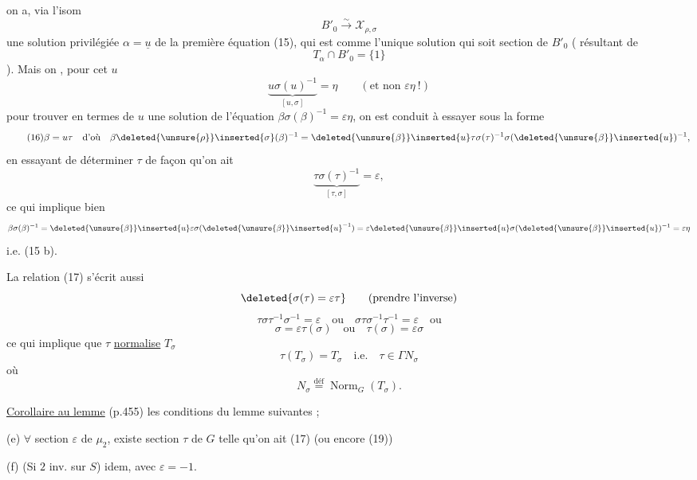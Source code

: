  on a, via l'isom
\[
B'_0\xrightarrow{\sim}\mathcal X_{\rho,\sigma}
\]
une solution privilégiée $\alpha=\underline u$ de la première équation (15), qui est
 comme l'unique solution qui soit  section de
$B'_0$ ( résultant de
\[
T_\alpha\cap B'_0=\{1\}
\]
).
Mais on , pour cet $u$
\[
\underbrace{u\sigma(u)^{-1}}_{[u,\sigma]}=\eta
\qquad(\text{et non }\varepsilon\eta\ !)
\]
pour trouver en termes de $u$ une solution de l'équation
 $\beta\sigma(\beta)^{-1}=\varepsilon\eta$, on est conduit à essayer sous la forme
\[
\tag{16}
\beta=u\tau\quad\text{d'où}\quad
\beta\deleted{\unsure{\rho}}\inserted{\sigma}(\beta)^{-1}
=\deleted{\unsure{\beta}}\inserted{u}\tau\sigma(\tau)^{-1}
\sigma(\deleted{\unsure{\beta}}\inserted{u})^{-1},
\]
en essayant de déterminer $\tau$ de façon qu'on ait
\[
\tag{17}
\underbrace{\tau\sigma(\tau)^{-1}}_{[\tau,\sigma]}=\varepsilon,
\]
ce qui implique bien
\[
\beta\sigma(\beta)^{-1}
=\deleted{\unsure{\beta}}\inserted{u}\varepsilon\sigma(\deleted{\unsure{\beta}}\inserted{u}^{-1})
=\varepsilon\deleted{\unsure{\beta}}\inserted{u}\sigma(\deleted{\unsure{\beta}}\inserted{u})^{-1}
=\varepsilon\eta
\]
i.e. (15 b). 

La relation (17) s'écrit aussi
\[
\deleted{\sigma(\tau)=\varepsilon\tau}
\qquad(\text{prendre l'inverse})
\]
\[
\tag{18}
\tau\sigma\tau^{-1}\sigma^{-1}=\varepsilon
\quad\text{ou}\quad
\sigma\tau\sigma^{-1}\tau^{-1}=\varepsilon
\quad\text{ou}
\]
\[
\tag{19}
\sigma=\varepsilon\tau(\sigma)
\quad\text{ou}\quad
\tau(\sigma)=\varepsilon\sigma
\]
ce qui implique que $\tau$ \uline{normalise} $T_\sigma$
\[
\tag{20}
\tau(T_\sigma)=T_\sigma\quad\text{i.e.}\quad\tau\in\Gamma N_\sigma
\]
où
\[
\tag{21}
N_\sigma\overset{\text{déf}}{=}\operatorname{Norm}_G(T_\sigma).
\]

\uline{Corollaire au lemme} (p.455) les conditions  du lemme
 
  suivantes ;

(e) $\forall$ section 
$\varepsilon$ de $\mu_2$, existe 
section  $\tau$ de $G$ telle qu'on ait (17) (ou encore (19))

(f) (Si $2$ inv. sur $S$) idem, avec $\varepsilon=-1$.


